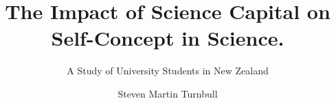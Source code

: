 %
%
%
%
%
%
\RequirePackage{fix-cm}
%

\documentclass[smallextended]{svjour3}       %
%
\smartqed  %
%
\usepackage{graphicx}
\usepackage{rotating}
\usepackage{url}
\usepackage{apacite}
%
%
%
%
%
\usepackage{afterpage}
\usepackage{csquotes}
\usepackage{lscape}


\title{The Impact of Science Capital on Self-Concept in Science.}


\subtitle{A Study of University Students in New Zealand}


\author{Steven Martin Turnbull        %
}

